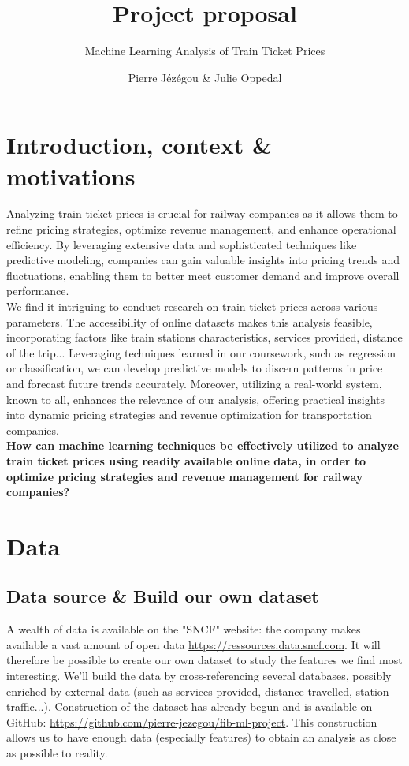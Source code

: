 \documentclass[10pt,a4paper,hidelinks]{article}
\title{Project proposal}
\subtitle{Machine Learning Analysis of Train Ticket Prices}
\date{}
\author{Pierre Jézégou \& Julie Oppedal}
\begin{document}
\maketitle

\section{Introduction, context \& motivations}
Analyzing train ticket prices is crucial for railway companies as it allows them to refine pricing strategies, optimize revenue management, and enhance operational efficiency. By leveraging extensive data and sophisticated techniques like predictive modeling, companies can gain valuable insights into pricing trends and fluctuations, enabling them to better meet customer demand and improve overall performance.\\

We find it intriguing to conduct research on train ticket prices across various parameters. The accessibility of online datasets makes this analysis feasible, incorporating factors like train stations characteristics, services provided, distance of the trip... Leveraging techniques learned in our coursework, such as regression or classification, we can develop predictive models to discern patterns in price and forecast future trends accurately. Moreover, utilizing a real-world system, known to all, enhances the relevance of our analysis, offering practical insights into dynamic pricing strategies and revenue optimization for transportation companies.\\

\textbf{How can machine learning techniques be effectively utilized to analyze train ticket prices using readily available online data, in order to optimize pricing strategies and revenue management for railway companies?}

\section{Data}
\subsection{Data source \& Build our own dataset}
A wealth of data is available on the "SNCF" website: the company makes available a vast amount of open data \url{https://ressources.data.sncf.com}. It will therefore be possible to create our own dataset to study the features we find most interesting. We'll build the data by cross-referencing several databases, possibly enriched by external data (such as services provided, distance travelled, station traffic...). 
Construction of the dataset has already begun and is available on GitHub: \url{https://github.com/pierre-jezegou/fib-ml-project}.  This construction allows us to have enough data (especially features) to obtain an analysis as close as possible to reality.
\end{document}
